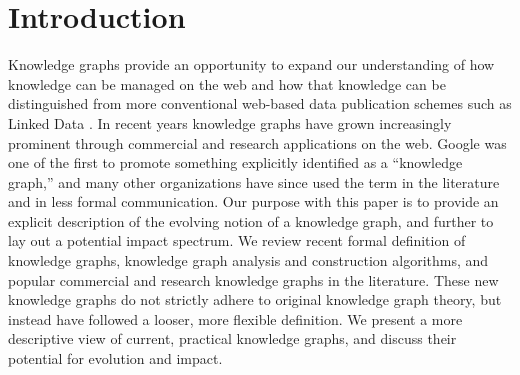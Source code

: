 \section{Introduction}


Knowledge graphs provide an opportunity to expand our understanding of how knowledge can be managed on the web and how that knowledge can be distinguished from more conventional web-based data publication schemes such as Linked Data \cite{bizer2009linked}.
In recent years knowledge graphs have grown increasingly prominent through commercial and research applications on the web.
Google was one of the first to promote something explicitly identified as a ``knowledge graph,'' \cite{singhal2012introducing} and many other organizations have since used the term in the literature and in less formal communication.
Our purpose with this paper is to provide an explicit description of the evolving notion of a knowledge graph, and further to lay out a potential impact spectrum.  
We review recent formal definition of knowledge graphs, knowledge graph analysis and construction algorithms, and popular commercial and research knowledge graphs in the literature.
These new knowledge graphs do not strictly adhere to original knowledge graph theory, but instead have followed a looser, more flexible definition.
We present a more descriptive view of current, practical knowledge graphs, and discuss their potential for evolution and impact.